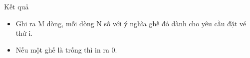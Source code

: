Kết quả  
\begin{itemize}
	\item     Ghi ra M dòng, mỗi dòng N số với ý nghĩa ghế đó dành cho yêu cầu đặt vé thứ i.   
	\item     Nếu một ghế là trống thì in ra 0.   
\end{itemize}